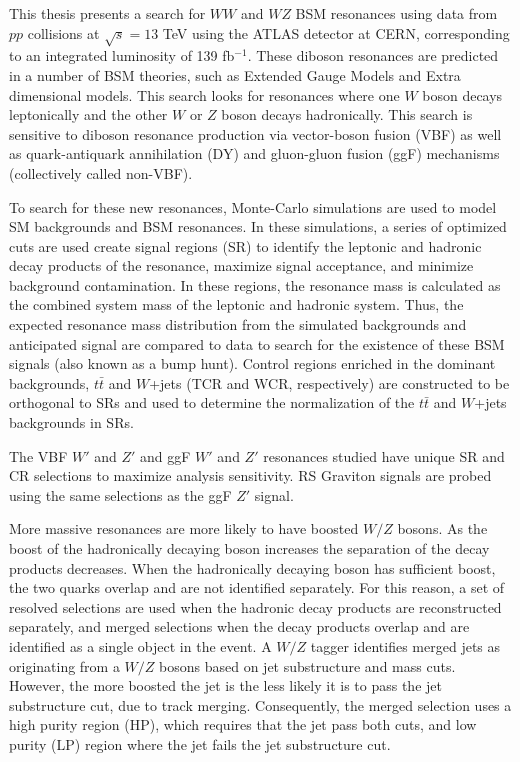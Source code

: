 This thesis presents a search for $WW$ and $WZ$ BSM resonances using data from $pp$ collisions at $\sqrt{s}=13$ TeV using the ATLAS detector at CERN, corresponding to an integrated luminosity of 139 fb$^{-1}$. These diboson resonances are predicted in a number of BSM theories, such as Extended Gauge Models and Extra dimensional models. This search looks for resonances where one $W$ boson decays leptonically and the other $W$ or $Z$ boson decays hadronically. This search is sensitive to diboson resonance production via vector-boson fusion (VBF) as well as quark-antiquark annihilation (DY) and gluon-gluon fusion (ggF) mechanisms (collectively called non-VBF).

To search for these new resonances, Monte-Carlo simulations are used to model SM backgrounds and BSM resonances. In these simulations, a series of optimized cuts are used create signal regions (SR) to identify the leptonic and hadronic decay products of the resonance, maximize signal acceptance, and minimize background contamination. In these regions, the resonance mass is calculated as the combined system mass of the leptonic and hadronic system. Thus, the expected resonance mass distribution from the simulated backgrounds and anticipated signal are compared to data to search for the existence of these BSM signals (also known as a bump hunt). Control regions enriched in the dominant backgrounds, $t\bar{t}$ and $W$+jets (TCR and WCR, respectively) are constructed to be orthogonal to SRs and used to determine the normalization of the $t\bar{t}$ and $W$+jets backgrounds in SRs.

The VBF $W'$ and $Z'$ and ggF $W'$ and $Z'$ resonances studied have unique SR and CR selections to maximize analysis sensitivity. RS Graviton signals are probed using the same selections as the ggF $Z'$ signal. 

More massive resonances are more likely to have boosted $W/Z$ bosons. As the boost of the hadronically decaying boson increases the separation of the decay products decreases. When the hadronically decaying boson has sufficient boost, the two quarks overlap and are not identified separately. For this reason, a set of resolved selections are used when the hadronic decay products are reconstructed separately, and merged selections when the decay products overlap and are identified as a single object in the event. A $W/Z$ tagger identifies merged jets as originating from a $W/Z$ bosons based on jet substructure and mass cuts. However, the more boosted the jet is the less likely it is to pass the jet substructure cut, due to track merging. Consequently, the merged selection uses a high purity region (HP), which requires that the jet pass both cuts, and low purity (LP) region where the jet fails the jet substructure cut. 

